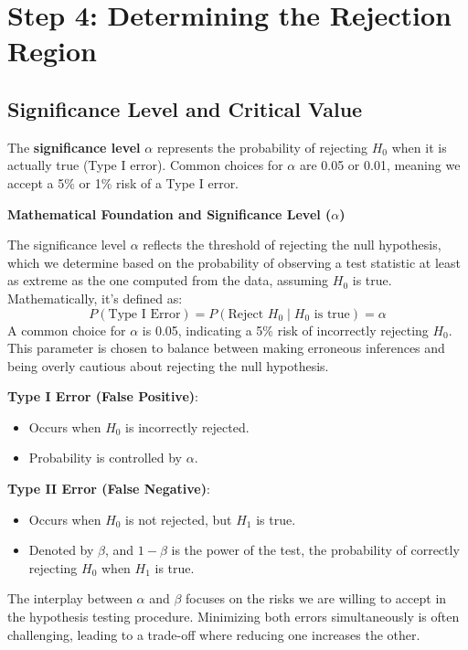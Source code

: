 \documentclass[11pt]{article}
\begin{document}
\section*{Step 4: Determining the Rejection Region}

\subsection*{Significance Level and Critical Value}
The \textbf{significance level} \( \alpha \) represents the probability of rejecting \( H_0 \) when it is actually true (Type I error). Common choices for \( \alpha \) are 0.05 or 0.01, meaning we accept a 5\% or 1\% risk of a Type I error.

\textbf{Mathematical Foundation and Significance Level (\( \alpha \))}

The significance level \( \alpha \) reflects the threshold of rejecting the null hypothesis, which we determine based on the probability of observing a test statistic at least as extreme as the one computed from the data, assuming \( H_0 \) is true. Mathematically, it's defined as:
\[
P(\text{Type I Error}) = P(\text{Reject } H_0 \mid H_0 \text{ is true}) = \alpha
\]
A common choice for \( \alpha \) is 0.05, indicating a 5\% risk of incorrectly rejecting \( H_0 \). This parameter is chosen to balance between making erroneous inferences and being overly cautious about rejecting the null hypothesis.

\noindent  \textbf{Type I Error (False Positive)}:
\begin{itemize}
  \item Occurs when \( H_0 \) is incorrectly rejected.
  \item Probability is controlled by \( \alpha \).
\end{itemize}

\noindent \textbf{Type II Error (False Negative)}:
\begin{itemize}
  \item Occurs when \( H_0 \) is not rejected, but \( H_1 \) is true.
  \item Denoted by \( \beta \), and \( 1 - \beta \) is the power of the test, the probability of correctly rejecting \( H_0 \) when \( H_1 \) is true.
\end{itemize}

The interplay between \( \alpha \) and \( \beta \) focuses on the risks we are willing to accept in the hypothesis testing procedure. Minimizing both errors simultaneously is often challenging, leading to a trade-off where reducing one increases the other.
\end{document}

